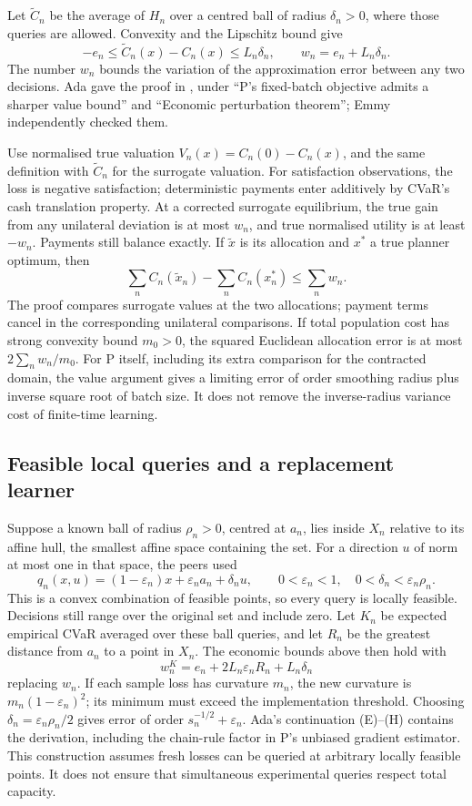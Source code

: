 \documentclass{article}
\begin{document}
Let \(\widetilde C_n\) be the average of \(H_n\) over a centred ball of radius \(\delta_n>0\), where those queries are allowed.
Convexity and the Lipschitz bound give
\[
 -e_n\le\widetilde C_n(x)-C_n(x)\le L_n\delta_n,
 \qquad w_n=e_n+L_n\delta_n.
\]
The number \(w_n\) bounds the variation of the approximation error between any two decisions.
Ada gave the proof in , under ``P's fixed-batch objective admits a sharper value
bound'' and ``Economic perturbation theorem''; Emmy independently checked them.

Use normalised true valuation \(V_n(x)=C_n(0)-C_n(x)\), and the same definition with \(\widetilde C_n\) for the surrogate valuation.
For satisfaction observations, the loss is negative satisfaction; deterministic payments enter additively by
CVaR's cash translation property.
At a corrected surrogate equilibrium, the true gain from any unilateral deviation is at most \(w_n\), and true
normalised utility is at least \(-w_n\).
Payments still balance exactly.
If \(\widetilde x\) is its allocation and \(x^*\) a true planner optimum, then
\[
 \sum_n C_n(\widetilde x_n)-\sum_n C_n(x_n^*)\le\sum_n w_n.
\]
The proof compares surrogate values at the two allocations; payment terms cancel in the corresponding unilateral comparisons.
If total population cost has strong convexity bound \(m_0>0\), the squared Euclidean allocation error is at most \(2\sum_n w_n/m_0\).
For P itself, including its extra comparison for the contracted domain, the value argument gives a limiting
error of order smoothing radius plus inverse square root of batch size.
It does not remove the inverse-radius variance cost of finite-time learning.

\subsection{Feasible local queries and a replacement learner}
Suppose a known ball of radius \(\rho_n>0\), centred at \(a_n\), lies inside \(X_n\) relative to its affine
hull, the smallest affine space containing the set.
For a direction \(u\) of norm at most one in that space, the peers used
\[
 q_n(x,u)=(1-\varepsilon_n)x+\varepsilon_na_n+\delta_nu,
 \qquad 0<\varepsilon_n<1,\quad 0<\delta_n<\varepsilon_n\rho_n.
\]
This is a convex combination of feasible points, so every query is locally feasible.
Decisions still range over the original set and include zero.
Let \(K_n\) be expected empirical CVaR averaged over these ball queries, and let \(R_n\) be the greatest
distance from \(a_n\) to a point in \(X_n\).
The economic bounds above then hold with
\[
 w_n^K=e_n+2L_n\varepsilon_nR_n+L_n\delta_n
\]
replacing \(w_n\).
If each sample loss has curvature \(m_n\), the new curvature is \(m_n(1-\varepsilon_n)^2\); its minimum must
exceed the implementation threshold.
Choosing \(\delta_n=\varepsilon_n\rho_n/2\) gives error of order \(s_n^{-1/2}+\varepsilon_n\).
Ada's continuation (E)--(H) contains the derivation, including the chain-rule factor in P's unbiased gradient estimator.
This construction assumes fresh losses can be queried at arbitrary locally feasible points.
It does not ensure that simultaneous experimental queries respect total capacity.
\end{document}
